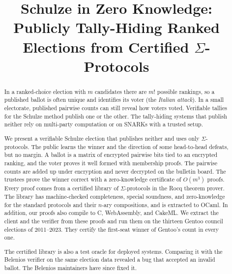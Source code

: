 \documentclass[conference,compsoc,a4paper]{IEEEtran}
\begin{document}
\title{Schulze in Zero Knowledge:\\ Publicly Tally-Hiding Ranked Elections from Certified $\Sigma$-Protocols}

\author{}

\maketitle

\begin{abstract}
In a ranked-choice election with $m$ candidates there are $m!$ possible
rankings, so a published ballot is often unique and identifies its voter
(the \emph{Italian attack}). In a small electorate, published pairwise
counts can still reveal how voters voted. Verifiable tallies for the Schulze method
publish one or the other. The tally-hiding systems that publish neither
rely on multi-party computation or on SNARKs with a trusted setup.

We present a verifiable Schulze election that publishes neither and uses
only $\Sigma$-protocols. The public learns the winner and the direction
of some head-to-head defeats, but no margin. A
ballot is a matrix of encrypted pairwise bits tied to an encrypted
ranking, and the voter proves it well formed with membership proofs. 
The pairwise counts are added up under encryption and never
decrypted on the bulletin board. The trustees prove the winner correct
with a zero-knowledge certificate of $O(m^3)$ proofs. Every proof comes 
from a certified
library of $\Sigma$-protocols in the Rocq theorem prover. The library has
machine-checked completeness, special soundness, and zero-knowledge for
the standard protocols and their $n$-ary compositions, and is extracted
to OCaml. In addition, our proofs also compile to C, WebAssembly, and
CakeML. We extract the client and the verifier
from these proofs and run them on the thirteen Gentoo council elections
of 2011--2023. They certify the first-seat winner of Gentoo's count in
every one.

The certified library is also a test oracle for deployed systems.
Comparing it with the Belenios verifier on the same election data
revealed a bug that accepted an invalid ballot. The Belenios maintainers
have since fixed it.
\end{abstract}










\end{document}
